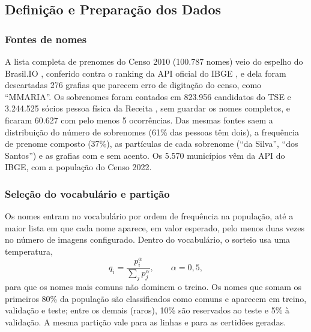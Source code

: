 \documentclass[12pt,a4paper]{article}
\begin{document}
\subsection{Definição e Preparação dos Dados}
\label{subsec:dados}

\subsubsection{Fontes de nomes}
A lista completa de prenomes do Censo 2010 (100.787 nomes) veio do espelho do Brasil.IO \cite{brasilio_nomes}, conferido contra o ranking da API oficial do IBGE \cite{ibge_nomes}, e dela foram descartadas 276 grafias que parecem erro de digitação do censo, como ``MMARIA''. Os sobrenomes foram contados em 823.956 candidatos do TSE \cite{tse_eleitorado} e 3.244.525 sócios pessoa física da Receita \cite{rfb_socios}, sem guardar os nomes completos, e ficaram 60.627 com pelo menos 5 ocorrências. Das mesmas fontes saem a distribuição do número de sobrenomes (61\% das pessoas têm dois), a frequência de prenome composto (37\%), as partículas de cada sobrenome (``da Silva'', ``dos Santos'') e as grafias com e sem acento. Os 5.570 municípios vêm da API do IBGE, com a população do Censo 2022.

\subsubsection{Seleção do vocabulário e partição}
Os nomes entram no vocabulário por ordem de frequência na população, até a maior lista em que cada nome aparece, em valor esperado, pelo menos duas vezes no número de imagens configurado. Dentro do vocabulário, o sorteio usa uma temperatura,
\[
q_i = \frac{p_i^{\alpha}}{\sum_j p_j^{\alpha}}, \qquad \alpha = 0{,}5,
\]
para que os nomes mais comuns não dominem o treino. Os nomes que somam os primeiros 80\% da população são classificados como comuns e aparecem em treino, validação e teste; entre os demais (raros), 10\% são reservados ao teste e 5\% à validação. A mesma partição vale para as linhas e para as certidões geradas.
\end{document}
